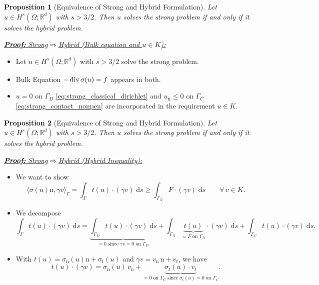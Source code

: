 \documentclass[10pt,aspectratio=169]{beamer}
\newtheorem{proposition}{Proposition}[section]
\def\R{{\mathbb R}}
\def\d{{\mathrm{d}}}
\def\ds{{\d s}}
\newcommand{\diver}{\operatornamewithlimits{div}}
\begin{document}
\begin{frame}
	\begin{proposition}[Equivalence of Strong and Hybrid Formulation]
		Let $u\in H^s(\Omega;\R^d)$ with $s>3/2$. Then $u$ solves the strong problem if and only if it solves the hybrid problem.
	\end{proposition}
	\underline{\textbf{\em Proof:} {\em Strong\enspace}$\Longrightarrow${\em\enspace Hybrid (Bulk equation and $u\in K$):}}
	\begin{itemize}
		\item Let $u\in H^s(\Omega;\R^d)$ with $s>3/2$ solve the strong problem.
		\item Bulk Equation $-\diver \sigma(u) = f$ appears in both.
		\item $u = 0$ on $\Gamma_D$ \eqref{eq:strong_classical_dirichlet} and $u_\mathrm{n}\le 0$ on $\Gamma_C$ \eqref{eq:strong_contact_nonpen} are incorporated in the requirement $u\in K$.
	\end{itemize}
\end{frame}

\begin{frame}
	\begin{proposition}[Equivalence of Strong and Hybrid Formulation]
		Let $u\in H^s(\Omega;\R^d)$ with $s>3/2$. Then $u$ solves the strong problem if and only if it solves the hybrid problem.
	\end{proposition}
	\underline{\textbf{\em Proof:} {\em Strong\enspace}$\Longrightarrow${\em\enspace Hybrid (Hybrid Inequality):}}
	\begin{itemize}
		\item We want to show
		      \begin{equation*}
			      \langle \sigma(u)\mathrm n,\gamma v\rangle_\Gamma
			      =
			      \int_{\Gamma} t(u)\cdot(\gamma v)\;\ds \ge \int_{\Gamma_N} F\cdot(\gamma v)\;\ds
			      \qquad
			      \forall\, v\in K.
		      \end{equation*}
		\item We decompose
		      \begin{equation*}
			      \int_\Gamma t(u)\cdot(\gamma v)\;\ds =\underbrace{\int_{\Gamma_D} t(u)\cdot(\gamma v)\;\ds}_{=0\text{ since } \gamma v= 0 \text{ on }\Gamma_D}+\int_{\Gamma_N} \underbrace{t(u)}_{= F\text{ on }\Gamma_N}\cdot(\gamma v)\;\ds+\int_{\Gamma_C} t(u)\cdot(\gamma v)\;\ds.
		      \end{equation*}
		\item With $t(u) = \sigma_\mathrm{n}(u)\mathrm{n}+\sigma_t(u)$ and $\gamma v = v_\mathrm{n}\,\mathrm{n}+v_t$, we have
		      \begin{equation*}
			      t(u)\cdot(\gamma v) = \sigma_\mathrm{n}(u)\,v_\mathrm{n}+\underbrace{\sigma_t(u)\cdot v_t}_{=0\text{ on }\Gamma_C \text{ since }\sigma_t(u)=0\text{ on }\Gamma_C}.
		      \end{equation*}
	\end{itemize}
\end{frame}
\end{document}
